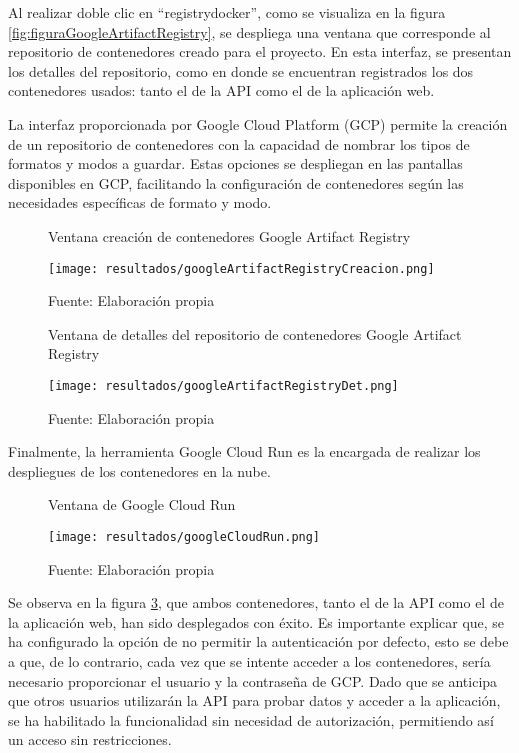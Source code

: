 Al realizar doble clic en ``registrydocker'', como se visualiza en la figura \ref{fig:figuraGoogleArtifactRegistry}, se despliega una ventana que corresponde al repositorio de contenedores creado para el proyecto. En esta interfaz, se presentan los detalles del repositorio, como en donde se encuentran registrados los dos contenedores usados: tanto el de la API como el de la aplicación web. \newline

La interfaz proporcionada por Google Cloud Platform (GCP) permite la creación de un repositorio de contenedores con la capacidad de nombrar los tipos de formatos y modos a guardar. Estas opciones se despliegan en las pantallas disponibles en GCP, facilitando la configuración de contenedores según las necesidades específicas de formato y modo.

\newpage

\begin{figure}[h]
	\centering
	\caption{Ventana creación de contenedores Google Artifact Registry}
	\texttt{[image: resultados/googleArtifactRegistryCreacion.png]}
	\caption*{\footnotesize Fuente: Elaboración propia}
	\label{fig:figuraGoogleArtifactRegistryCreacion}
\end{figure}

\newpage

\begin{figure}[h]
	\centering
	\caption{Ventana de detalles del repositorio de contenedores Google Artifact Registry}
	\texttt{[image: resultados/googleArtifactRegistryDet.png]}
	\caption*{\footnotesize Fuente: Elaboración propia}
	\label{fig:figuraGoogleArtifactRegistryDet}
\end{figure}

Finalmente, la herramienta Google Cloud Run es la encargada de realizar los despliegues de los contenedores en la nube.

\newpage

\begin{figure}[h]
	\centering
	\caption{Ventana de Google Cloud Run}
	\texttt{[image: resultados/googleCloudRun.png]}
	\caption*{\footnotesize Fuente: Elaboración propia}
	\label{fig:figuraGoogleCloudRun}
\end{figure}

Se observa en la figura \ref{fig:figuraGoogleCloudRun}, que ambos contenedores, tanto el de la API como el de la aplicación web, han sido desplegados con éxito. Es importante explicar que, se ha configurado la opción de no permitir la autenticación por defecto, esto se debe a que, de lo contrario, cada vez que se intente acceder a los contenedores, sería necesario proporcionar el usuario y la contraseña de GCP. Dado que se anticipa que otros usuarios utilizarán la API para probar datos y acceder a la aplicación, se ha habilitado la funcionalidad sin necesidad de autorización, permitiendo así un acceso sin restricciones. \newline

